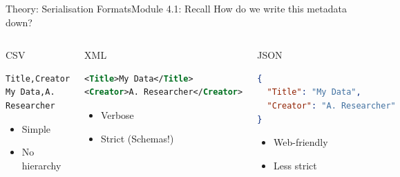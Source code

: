 \begin{frame}[fragile]{Theory: Serialisation Formats}{Module 4.1: Recall}
    How do we write this metadata down?
    
    \begin{columns}
        \begin{block}{CSV}
        \vspace{1.2ex}
            \begin{lstlisting}[language=CSV]
Title,Creator
My Data,A. Researcher
            \end{lstlisting}
            \vspace{1.2ex}
            \begin{itemize}
                \item Simple
                \item No hierarchy
            \end{itemize}
            
        \end{block}
        
        \begin{block}{XML}
        \vspace{1.2ex}
            \begin{lstlisting}[language=XML]
<Title>My Data</Title>
<Creator>A. Researcher</Creator>
            \end{lstlisting}
            \vspace{1.2ex}
            \begin{itemize}
                \item Verbose
                \item Strict (Schemas!)
            \end{itemize}
        \end{block}
        
        \begin{block}{JSON}
            \begin{lstlisting}[language=json]
{
  "Title": "My Data",
  "Creator": "A. Researcher"
}
            \end{lstlisting}
            \begin{itemize}
                \item Web-friendly
                \item Less strict
            \end{itemize}
        \end{block}
    \end{columns}
\end{frame}

